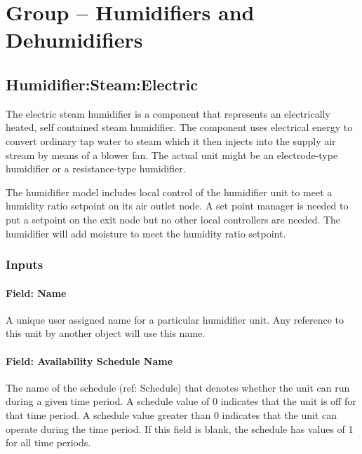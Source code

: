 \section{Group -- Humidifiers and Dehumidifiers}\label{group-humidifiers-and-dehumidifiers}

\subsection{Humidifier:Steam:Electric}\label{humidifiersteamelectric}

The electric steam humidifier is a component that represents an electrically heated, self contained steam humidifier. The component uses electrical energy to convert ordinary tap water to steam which it then injects into the supply air stream by means of a blower fan. The actual unit might be an electrode-type humidifier or a resistance-type humidifier.

The humidifier model includes local control of the humidifier unit to meet a humidity ratio setpoint on its air outlet node. A set point manager is needed to put a setpoint on the exit node but no other local controllers are needed. The humidifier will add moisture to meet the humidity ratio setpoint.

\subsubsection{Inputs}\label{inputs-023}

\paragraph{Field: Name}\label{field-name-022}

A unique user assigned name for a particular humidifier unit. Any reference to this unit by another object will use this name.

\paragraph{Field: Availability Schedule Name}\label{field-availability-schedule-name-010}

The name of the schedule (ref: Schedule) that denotes whether the unit can run during a given time period. A schedule value of 0 indicates that the unit is off for that time period. A schedule value greater than 0 indicates that the unit can operate during the time period. If this field is blank, the schedule has values of 1 for all time periods.

